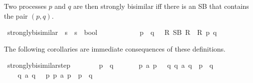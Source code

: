 \begin{isabellebody}
\begin{isamarkuptext}%
\pagebreak
Two processes $p$ and $q$ are then strongly bisimilar iff there is an SB that contains the pair $(p, q)$.%
\end{isamarkuptext}\isamarkuptrue%
\isamarkupfalse%
\ strongly{\isacharunderscore}{\kern0pt}bisimilar\ {\isacharcolon}{\kern0pt}{\isacharcolon}{\kern0pt}\ {\isacartoucheopen}{\isacharprime}{\kern0pt}s\ {\isasymRightarrow}\ {\isacharprime}{\kern0pt}s\ {\isasymRightarrow}\ bool{\isacartoucheclose}\ \isanewline
\ \ {\isacharparenleft}{\kern0pt}{\isacartoucheopen}{\isacharunderscore}{\kern0pt}\ {\isasymleftrightarrow}\ {\isacharunderscore}{\kern0pt}{\isacartoucheclose}\ {\isacharbrackleft}{\kern0pt}{}{}{\isacharcomma}{\kern0pt}\ {}{}{\isacharbrackright}{\kern0pt}\ {}{}{\isacharparenright}{\kern0pt}\isanewline
\ \ \ {\isacartoucheopen}p\ {\isasymleftrightarrow}\ q\ {\isasymequiv}\ {\isasymexists}\ R{\isachardot}{\kern0pt}\ SB\ R\ {\isasymand}\ R\ p\ q{\isacartoucheclose}%
\begin{isamarkuptext}%
The following corollaries are immediate consequences of these definitions.%
\end{isamarkuptext}\isamarkuptrue%
\isamarkupfalse%
\ strongly{\isacharunderscore}{\kern0pt}bisimilar{\isacharunderscore}{\kern0pt}step{\isacharcolon}{\kern0pt}\isanewline
\ \ \ \isanewline
\ \ \ \ {\isacartoucheopen}p\ {\isasymleftrightarrow}\ q{\isacartoucheclose}\isanewline
\ \ \isanewline
\ \ \ \ {\isacartoucheopen}p\ {\isasymlongmapsto}a\ p{\isacharprime}{\kern0pt}\ {\isasymLongrightarrow}\ {\isacharparenleft}{\kern0pt}{\isasymexists}\ q{\isacharprime}{\kern0pt}{\isachardot}{\kern0pt}\ {\isacharparenleft}{\kern0pt}q\ {\isasymlongmapsto}a\ q{\isacharprime}{\kern0pt}{\isacharparenright}{\kern0pt}\ {\isasymand}\ p{\isacharprime}{\kern0pt}\ {\isasymleftrightarrow}\ q{\isacharprime}{\kern0pt}{\isacharparenright}{\kern0pt}{\isacartoucheclose}\isanewline
\ \ \ \ {\isacartoucheopen}q\ {\isasymlongmapsto}a\ q{\isacharprime}{\kern0pt}\ {\isasymLongrightarrow}\ {\isacharparenleft}{\kern0pt}{\isasymexists}\ p{\isacharprime}{\kern0pt}{\isachardot}{\kern0pt}\ {\isacharparenleft}{\kern0pt}p\ {\isasymlongmapsto}a\ p{\isacharprime}{\kern0pt}{\isacharparenright}{\kern0pt}\ {\isasymand}\ p{\isacharprime}{\kern0pt}\ {\isasymleftrightarrow}\ q{\isacharprime}{\kern0pt}{\isacharparenright}{\kern0pt}{\isacartoucheclose}\isanewline
%
\isadelimproof

\end{isabellebody}
